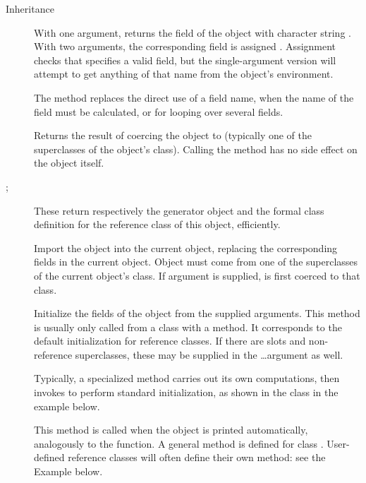 \begin{Section}{Inheritance}
\begin{description}
\item[]  
With one argument, returns the field of the object with character
string .  With two arguments, the corresponding field is
assigned .  Assignment checks that  specifies a
valid field, but the single-argument version will attempt to get
anything of that name from the object's environment.

The  
method replaces the direct use of a field name, when the name of the
field must be calculated, or for looping over several fields.


\item[]  
Returns the result of coercing the object to  (typically
one of the superclasses of the object's class).  Calling the method
has no side effect on the object itself.


\item[; ] 
These return respectively the generator object and the formal class
definition for the reference class of this object, efficiently.




\item[]  
Import the object  into the current object, replacing the
corresponding fields in the current object.
Object  must come from one of the superclasses of the
current object's class.
If argument  is supplied,  is first coerced to
that class.


\item[]  
Initialize the fields of the object from the supplied arguments.  This
method is usually only called from a class with a 
method.  It corresponds to the default initialization for reference
classes.  If there are slots and non-reference superclasses, these may
be supplied in the \dots argument as well.

Typically, a specialized 
method carries out its own computations, then invokes 
to perform standard initialization, as shown in the
 class in the example below.


\item[]  
This method is called when the object is printed automatically,
analogously to the  function.  A general method is
defined for class .  User-defined reference
classes will often define their own method: see the Example below.


\end{description}
\end{Section}
